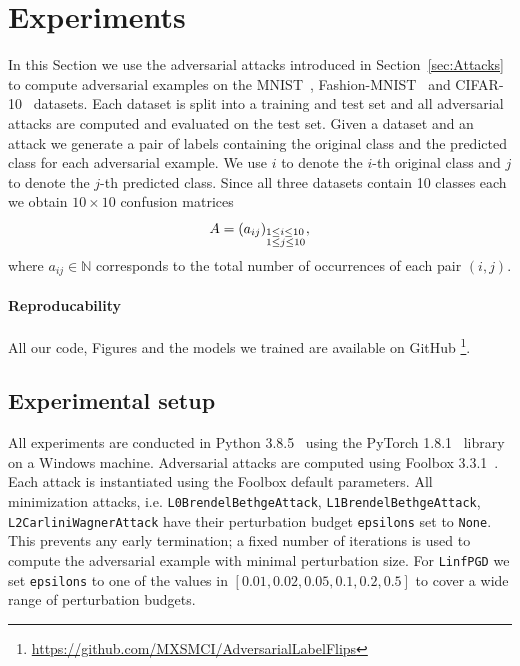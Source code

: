 \documentclass{article}
\begin{document}
\section{Experiments}
\label{sec:experiments}

In this Section we use the adversarial attacks introduced in Section~\ref{sec:Attacks} to compute adversarial examples on the MNIST~\cite{deng2012mnist}, Fashion-MNIST~\cite{xiao2017fashion} and CIFAR-10~\cite{krizhevsky2009learning} datasets. Each dataset is split into a training and test set and all adversarial attacks are computed and evaluated on the test set. Given a dataset and an attack we generate a pair of labels containing the original class and the predicted class for each adversarial example. We use $i$ to denote the $i$-th original class and $j$ to denote the $j$-th predicted class. Since all three datasets contain 10 classes each we obtain $10\times10$ confusion matrices
\[A=(a_{ij})_{\begin{subarray}{l} 1\le i\le 10 \\ 1\le j\le 10\end{subarray}},\]
where $a_{ij}\in\mathbb{N}$ corresponds to the total number of occurrences of each pair $(i,j)$.

\paragraph{Reproducability}All our code, Figures and the models we trained are available on GitHub \footnote{\url{https://github.com/MXSMCI/AdversarialLabelFlips}}.

\subsection{Experimental setup}
All experiments are conducted in Python 3.8.5~\cite{van1995python} using the PyTorch 1.8.1~\cite{pytorch} library on a Windows machine. Adversarial attacks are computed using Foolbox 3.3.1~\cite{rauber2017foolbox}. Each attack is instantiated using the Foolbox default parameters. All minimization attacks, i.e. \texttt{L0BrendelBethgeAttack}, \texttt{L1BrendelBethgeAttack}, \texttt{L2CarliniWagnerAttack} have their perturbation budget \texttt{epsilons} set to \texttt{None}. This prevents any early termination; a fixed number of iterations is used to compute the adversarial example with minimal perturbation size. For \texttt{LinfPGD} we set \texttt{epsilons} to one of the values in $[0.01, 0.02, 0.05, 0.1, 0.2, 0.5]$ to cover a wide range of perturbation budgets.
\end{document}
